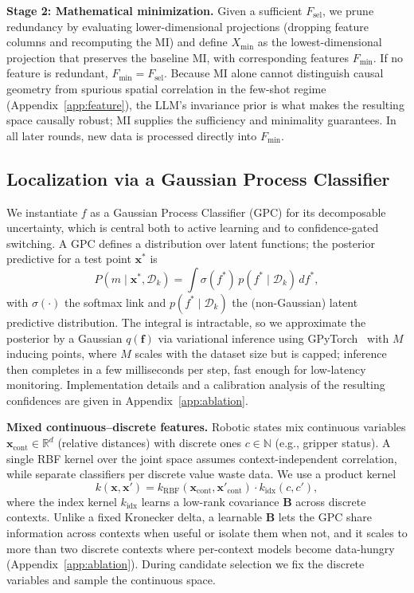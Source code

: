 \textbf{Stage 2: Mathematical minimization.} Given a sufficient $F_{\text{sel}}$, we prune redundancy by evaluating lower-dimensional projections (dropping feature columns and recomputing the MI) and define $X_{\min}$ as the lowest-dimensional projection that preserves the baseline MI, with corresponding features $F_{\min}$. If no feature is redundant, $F_{\min}=F_{\text{sel}}$.  Because MI alone cannot distinguish causal geometry from spurious spatial correlation in the few-shot regime (Appendix~\ref{app:feature}), the LLM's invariance prior is what makes the resulting space causally robust; MI supplies the sufficiency and minimality guarantees. In all later rounds, new data is processed directly into $F_{\min}$.

\subsection{Localization via a Gaussian Process Classifier}
\label{sec:gpc}
We instantiate $f$ as a Gaussian Process Classifier (GPC) for its decomposable uncertainty, which is central both to active learning and to confidence-gated switching. A GPC defines a distribution over latent functions; the posterior predictive for a test point $\mathbf{x}^*$ is
\begin{equation}
P(m\mid\mathbf{x}^*,\mathcal{D}_{k})=\int\sigma(f^*)\,p(f^*\mid\mathcal{D}_{k})\,df^*,
\end{equation}
with $\sigma(\cdot)$ the softmax link and $p(f^*\mid\mathcal{D}_{k})$ the (non-Gaussian) latent predictive distribution. The integral is intractable, so we approximate the posterior by a Gaussian $q(\mathbf{f})$ via variational inference using GPyTorch~\cite{gardner2018gpytorch} with $M$ inducing points, where $M$ scales with the dataset size but is capped; inference then completes in a few milliseconds per step, fast enough for low-latency monitoring. Implementation details and a calibration analysis of the resulting confidences are given in Appendix~\ref{app:ablation}.

\textbf{Mixed continuous--discrete features.} Robotic states mix continuous variables $\mathbf{x}_{\text{cont}}\in\mathbb{R}^d$ (relative distances) with discrete ones $c\in\mathbb{N}$ (e.g., gripper status). A single RBF kernel over the joint space assumes context-independent correlation, while separate classifiers per discrete value waste data. We use a product kernel
\begin{equation}
k(\mathbf{x},\mathbf{x}')=k_{\text{RBF}}(\mathbf{x}_{\text{cont}},\mathbf{x}'_{\text{cont}})\cdot k_{\text{idx}}(c,c'),
\end{equation}
where the index kernel $k_{\text{idx}}$ learns a low-rank covariance $\mathbf{B}$ across discrete contexts. Unlike a fixed Kronecker delta, a learnable $\mathbf{B}$ lets the GPC share information across contexts when useful or isolate them when not, and it scales to more than two discrete contexts where per-context models become data-hungry (Appendix~\ref{app:ablation}). During candidate selection we fix the discrete variables and sample the continuous space.

